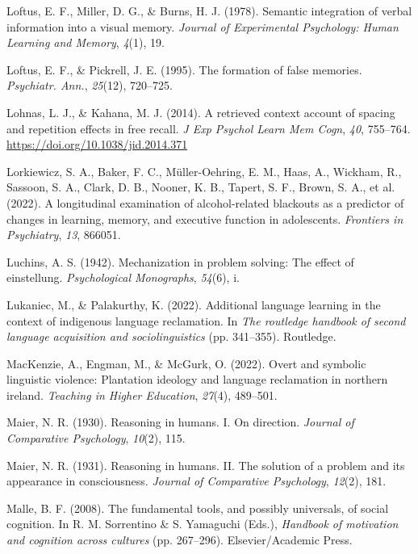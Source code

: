 \documentclass[
]{krantz}
\newlength{\cslhangindent}
\newenvironment{CSLReferences}[2] %
 {\begin{list}{}{%
  \setlength{\itemindent}{0pt}
  \setlength{\leftmargin}{0pt}
  \setlength{\parsep}{0pt}
  \ifodd #1
   \setlength{\leftmargin}{\cslhangindent}
   \setlength{\itemindent}{-1\cslhangindent}
  \fi
  \setlength{\itemsep}{#2\baselineskip}}}
 {\end{list}}
\begin{document}
\begin{CSLReferences}{1}{0}
Loftus, E. F., Miller, D. G., \& Burns, H. J. (1978). Semantic integration of verbal information into a visual memory. \emph{Journal of Experimental Psychology: Human Learning and Memory}, \emph{4}(1), 19.

Loftus, E. F., \& Pickrell, J. E. (1995). The formation of false memories. \emph{Psychiatr. Ann.}, \emph{25}(12), 720--725.

Lohnas, L. J., \& Kahana, M. J. (2014). A retrieved context account of spacing and repetition effects in free recall. \emph{J Exp Psychol Learn Mem Cogn}, \emph{40}, 755--764. \url{https://doi.org/10.1038/jid.2014.371}

{Lorkiewicz, S. A., Baker, F. C., Müller-Oehring, E. M., Haas, A., Wickham, R., Sassoon, S. A., Clark, D. B., Nooner, K. B., Tapert, S. F., Brown, S. A., et al.} (2022). A longitudinal examination of alcohol-related blackouts as a predictor of changes in learning, memory, and executive function in adolescents. \emph{Frontiers in Psychiatry}, \emph{13}, 866051.

Luchins, A. S. (1942). Mechanization in problem solving: The effect of einstellung. \emph{Psychological Monographs}, \emph{54}(6), i.

Lukaniec, M., \& Palakurthy, K. (2022). Additional language learning in the context of indigenous language reclamation. In \emph{The routledge handbook of second language acquisition and sociolinguistics} (pp. 341--355). Routledge.

MacKenzie, A., Engman, M., \& McGurk, O. (2022). Overt and symbolic linguistic violence: Plantation ideology and language reclamation in northern ireland. \emph{Teaching in Higher Education}, \emph{27}(4), 489--501.

Maier, N. R. (1930). Reasoning in humans. I. On direction. \emph{Journal of Comparative Psychology}, \emph{10}(2), 115.

Maier, N. R. (1931). Reasoning in humans. II. The solution of a problem and its appearance in consciousness. \emph{Journal of Comparative Psychology}, \emph{12}(2), 181.

Malle, B. F. (2008). The fundamental tools, and possibly universals, of social cognition. In R. M. Sorrentino \& S. Yamaguchi (Eds.), \emph{Handbook of motivation and cognition across cultures} (pp. 267--296). Elsevier/Academic Press.


\end{CSLReferences}
\end{document}
